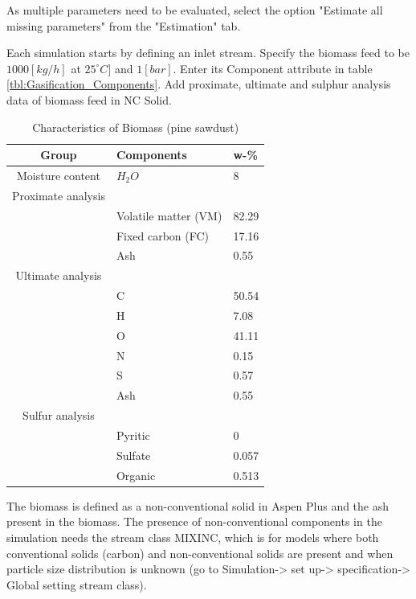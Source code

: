 As multiple parameters need to be evaluated, select the option "Estimate all missing parameters" from the "Estimation" tab. 


Each simulation starts by defining an inlet stream. Specify the biomass feed to be $1000 [kg/h]$ at $25 ^\circ C]$ and $1 [bar]$. Enter its Component attribute in table \ref{tbl:Gasification_Components}. Add proximate, ultimate and sulphur analysis data of biomass feed in NC Solid.

\begin{table}[h!]
	\centering
	\begin{tabular}{cll}
			\hline
			Group				&	Components				&	w-\% 	\\ \hline 
			Moisture content	&	$H_2O$					&	8		\\ \hline
			\multicolumn{1}{c}{Proximate analysis}&\\
			\cline{1-1}
								&	Volatile matter (VM)	& 	82.29	\\
								& 	Fixed carbon (FC) 		& 	17.16  	\\
								&	Ash 					& 	0.55	\\ \hline
			\multicolumn{1}{c}{Ultimate  analysis}&\\
			\cline{1-1}
								& 	C 						&	50.54	\\
								&	H 						& 	7.08	\\
								&	O 						& 	41.11 	\\
								&	N 						& 	0.15	\\
								&	S 						& 	0.57	\\
								&	Ash 					&	0.55	\\ \hline
			\multicolumn{1}{c}{Sulfur  analysis}&\\
			\cline{1-1}
								&		Pyritic 			& 0			\\
								&		Sulfate 			& 0.057		\\
								&		Organic 			& 0.513		\\
			\hline
	\end{tabular}
	\caption{Characteristics of Biomass (pine sawdust)}
	\label{tbl:Biomass_Composition}
\end{table}

The biomass is defined as a non-conventional solid in Aspen Plus and the ash present in the biomass. The presence of non-conventional components in the simulation needs the stream class MIXINC, which is for models where both conventional solids (carbon) and non-conventional solids are present and when particle size distribution is unknown (go to Simulation-> set up-> specification-> Global setting stream class). 

